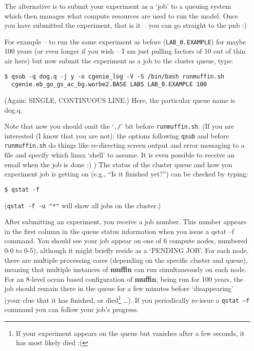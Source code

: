 \documentclass[11pt,fleqn]{book} %
\begin{document}
\noindent The alternative is to submit your experiment as a ‘job’ to a queuing system which then manages what compute resources are used to run the model. Once you have submitted the experiment, that is it – you can go straight to the pub :)

For example -- to run the same experiment as before (\texttt{LAB\_0.EXAMPLE}) for maybe 100 years (or even longer if you wish – I am just pulling factors of 10 out of thin air here) but now submit the experiment as a job to the cluster queue, type:
\vspace{-1mm}
\small\begin{verbatim}
$ qsub -q dog.q -j y -o cgenie_log -V -S /bin/bash runmuffin.sh
  cgenie.eb_go_gs_ac_bg.worbe2.BASE LABS LAB_0.EXAMPLE 100
\end{verbatim}\normalsize
\vspace{-1mm}

\noindent(Again: SINGLE, CONTINUOUS LINE.) Here, the particular queue name is \textsf{dog.q}.

Note that now you should omit the ‘\texttt{./}’ bit before \texttt{runmuffin.sh}.
(If you are interested (I know that you are not): the options following \texttt{qsub} and before \texttt{runmuffin.sh} do things like re-directing screen output and error messaging to a file and specify which linux ‘shell’ to assume. It is even possible to receive an email when the job is done :) )
The status of the cluster queue and how you experiment job is getting on (e.g., “Is it finished yet?”) can be checked by typing:
\vspace{-1mm}
\small\begin{verbatim}
$ qstat -f
\end{verbatim}\normalsize
\vspace{-1mm}
(\texttt{qstat -f -u "*"} will show all jobs on the cluster.)

After submitting an experiment, you receive a job number. This number appears in the first column in the queue status information when you issue a qstat –f command. You should see your job appear on one of 6 compute nodes, numbered 0-0 to 0-5), although it might briefly reside as a ‘PENDING JOB’. For each node, there are multiple processing cores (depending on the specific cluster and queue), meaning that multiple instances of \textbf{muffin} can run simultaneously on each node. For an 8-level ocean based configuration of \textbf{muffin}, being run for 100 years, the job should remain there in the queue for a few minutes before ‘disappearing’ (your clue that it has finished, or died\footnote{If your experiment appears on the queue but vanishes after a few seconds, it has most likely died :(} …). If you periodically re-issue a \texttt{qstat –f} command you can follow your job’s progress.
\end{document}
